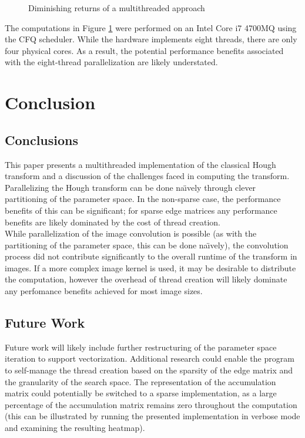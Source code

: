 \documentclass[letterpaper,12pt]{article}
\begin{document}
\begin{figure}[H]
    \caption{Diminishing returns of a multithreaded approach}
    \label{fig:graph}
\end{figure}

The computations in Figure \ref{fig:graph} were performed on an Intel Core i7 4700MQ using the CFQ scheduler.
While the hardware implements eight threads, there are only four physical cores. As a result, the potential
performance benefits associated with the eight-thread parallelization are likely understated.

\section{Conclusion}
\subsection{Conclusions}
This paper presents a multithreaded implementation of the classical Hough transform and a discussion
of the challenges faced in computing the transform.
Parallelizing the Hough transform can be done na\"{\i}vely through clever partitioning of the parameter space.
In the non-sparse case, the performance benefits of this can be significant; for sparse edge matrices any performance
benefits are likely dominated by the cost of thread creation.
\\
While parallelization of the image convolution is possible (as with the partitioning of the parameter space,
this can be done na\"{\i}vely), the convolution process did not contribute significantly to the overall
runtime of the transform in images. If a more complex image kernel is used, it may be desirable to distribute the
computation, however the overhead of thread creation will likely dominate any perfomance benefits achieved for
most image sizes.

\subsection{Future Work}
Future work will likely include further restructuring of the parameter space iteration to support vectorization.
Additional research could enable the program to self-manage the thread creation based on the sparsity of the edge
matrix and the granularity of the search space. The representation of the accumulation matrix could potentially
be switched to a sparse implementation, as a large percentage of the accumulation matrix remains zero throughout
the computation (this can be illustrated by running the presented implementation in verbose mode and examining
the resulting heatmap).

\newpage

\end{document}
